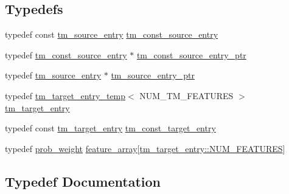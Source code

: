 \subsection*{Typedefs}
\begin{DoxyCompactItemize}
\item 
typedef const \hyperlink{classuva_1_1smt_1_1bpbd_1_1server_1_1tm_1_1models_1_1tm__source__entry}{tm\+\_\+source\+\_\+entry} \hyperlink{namespaceuva_1_1smt_1_1bpbd_1_1server_1_1tm_1_1models_a86b26049fe9aeb13a850852d897a2a77}{tm\+\_\+const\+\_\+source\+\_\+entry}
\item 
typedef \hyperlink{namespaceuva_1_1smt_1_1bpbd_1_1server_1_1tm_1_1models_a86b26049fe9aeb13a850852d897a2a77}{tm\+\_\+const\+\_\+source\+\_\+entry} $\ast$ \hyperlink{namespaceuva_1_1smt_1_1bpbd_1_1server_1_1tm_1_1models_a841bb11e4e9f70fbde7a8ca1ae533681}{tm\+\_\+const\+\_\+source\+\_\+entry\+\_\+ptr}
\item 
typedef \hyperlink{classuva_1_1smt_1_1bpbd_1_1server_1_1tm_1_1models_1_1tm__source__entry}{tm\+\_\+source\+\_\+entry} $\ast$ \hyperlink{namespaceuva_1_1smt_1_1bpbd_1_1server_1_1tm_1_1models_a1d82a5b873eb7c02ad8b187f7c1b5a8e}{tm\+\_\+source\+\_\+entry\+\_\+ptr}
\item 
typedef \hyperlink{classuva_1_1smt_1_1bpbd_1_1server_1_1tm_1_1models_1_1tm__target__entry__temp}{tm\+\_\+target\+\_\+entry\+\_\+temp}$<$ N\+U\+M\+\_\+\+T\+M\+\_\+\+F\+E\+A\+T\+U\+R\+E\+S $>$ \hyperlink{namespaceuva_1_1smt_1_1bpbd_1_1server_1_1tm_1_1models_a43e25042ab4fd684acdfeb24099aefa0}{tm\+\_\+target\+\_\+entry}
\item 
typedef const \hyperlink{namespaceuva_1_1smt_1_1bpbd_1_1server_1_1tm_1_1models_a43e25042ab4fd684acdfeb24099aefa0}{tm\+\_\+target\+\_\+entry} \hyperlink{namespaceuva_1_1smt_1_1bpbd_1_1server_1_1tm_1_1models_ae043b2a8672e39fe61239f7f1ece86ab}{tm\+\_\+const\+\_\+target\+\_\+entry}
\item 
typedef \hyperlink{namespaceuva_1_1smt_1_1bpbd_1_1server_a01e9ea4de9c226f4464862e84ff0bbcc}{prob\+\_\+weight} \hyperlink{namespaceuva_1_1smt_1_1bpbd_1_1server_1_1tm_1_1models_a2181caec035a699138a4dcedfd7c2c26}{feature\+\_\+array}\mbox{[}\hyperlink{classuva_1_1smt_1_1bpbd_1_1server_1_1tm_1_1models_1_1tm__target__entry__temp_a573774a3d8a5e4c1c0a0ba1c00b5e7c7}{tm\+\_\+target\+\_\+entry\+::\+N\+U\+M\+\_\+\+F\+E\+A\+T\+U\+R\+E\+S}\mbox{]}
\end{DoxyCompactItemize}


\subsection{Typedef Documentation}
\hypertarget{namespaceuva_1_1smt_1_1bpbd_1_1server_1_1tm_1_1models_a2181caec035a699138a4dcedfd7c2c26}{}
